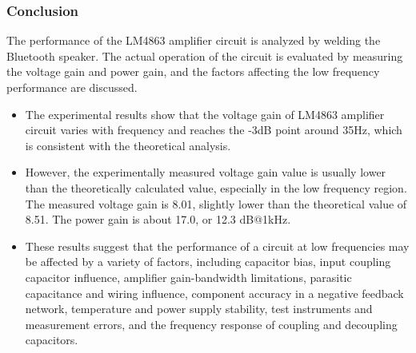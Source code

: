 \subsubsection{Conclusion}

The performance of the LM4863 amplifier circuit is analyzed by welding the Bluetooth speaker. The actual operation of the circuit is evaluated by measuring the voltage gain and power gain, and the factors affecting the low frequency performance are discussed.

\begin{itemize}
	\item The experimental results show that the voltage gain of LM4863 amplifier circuit varies with frequency and reaches the -3dB point around 35Hz, which is consistent with the theoretical analysis.
	\item However, the experimentally measured voltage gain value is usually lower than the theoretically calculated value, especially in the low frequency region. The measured voltage gain is 8.01, slightly lower than the theoretical value of 8.51. The power gain is about 17.0, or 12.3 dB@1kHz. 
	\item These results suggest that the performance of a circuit at low frequencies may be affected by a variety of factors, including capacitor bias, input coupling capacitor influence, amplifier gain-bandwidth limitations, parasitic capacitance and wiring influence, component accuracy in a negative feedback network, temperature and power supply stability, test instruments and measurement errors, and the frequency response of coupling and decoupling capacitors.
\end{itemize}
